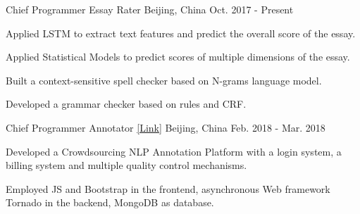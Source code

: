 

\begin{cventries}

  \cventry
    {Chief Programmer} %
    {Essay Rater} %
    {Beijing, China} %
    {Oct. 2017 - Present} %
    {
      \begin{cvitems} %
        \item {Applied LSTM to extract text features and predict the overall score of the essay.}
        \item {Applied Statistical Models to predict scores of multiple dimensions of the essay.}
        \item {Built a context-sensitive spell checker based on N-grams language model.}
        \item {Developed a grammar checker based on rules and CRF.}
      \end{cvitems}
    }

  \cventry
    {Chief Programmer} %
    {Annotator \href{http://mark.17zuoye.net/}{[\underline{Link}]}} %
    {Beijing, China} %
    {Feb. 2018 - Mar. 2018} %
    {
      \begin{cvitems} %
        \item {Developed a Crowdsourcing NLP Annotation Platform with a login system, a billing system and multiple quality control mechanisms.}
        \item {Employed JS and Bootstrap in the frontend, asynchronous Web framework Tornado in the backend, MongoDB as database.}
      \end{cvitems}
    }



\end{cventries}
